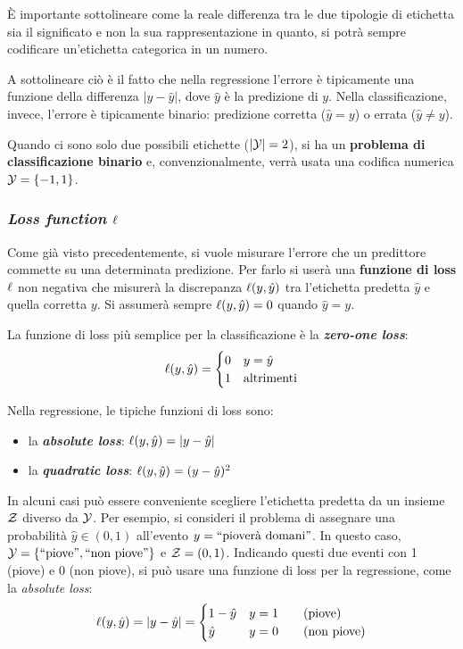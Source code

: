 È importante sottolineare come la reale differenza tra le due tipologie di etichetta sia il
significato e non la sua rappresentazione in quanto, si potrà sempre codificare
un'etichetta categorica in un numero.

A sottolineare ciò è il fatto che nella regressione l'errore è tipicamente una funzione della
differenza $| y-\hat{y} |$, dove $\hat{y}$ è la predizione di $y$. Nella classificazione, invece,
l'errore è tipicamente binario: predizione corretta ($\hat{y}=y$) o errata ($\hat{y}\neq y$).

Quando ci sono solo due possibili etichette ($|\mathcal{Y}|=2$), si ha un \textbf{problema di 
classificazione binario} e, convenzionalmente, verrà usata una codifica numerica 
$\mathcal{Y}=\{-1,1\}$.

\subsubsection{\textit{Loss function} \texorpdfstring{$\ell$}{l}}
Come già visto precedentemente, si vuole misurare l'errore che un predittore commette su una
determinata predizione. Per farlo si userà una \textbf{funzione di loss} $\ell$ non negativa 
che misurerà la discrepanza $\ell(y,\hat{y})$ tra l'etichetta predetta $\hat{y}$ e quella
corretta $y$. Si assumerà sempre $\ell(y,\hat{y})=0$ quando $\hat{y}=y$.

La funzione di loss più semplice per la classificazione è la \textit{\textbf{zero-one loss}}:
$$ \ell(y,\hat{y}) = \begin{cases} 0 & y=\hat{y} \\ 1 & \text{altrimenti} \end{cases} $$

Nella regressione, le tipiche funzioni di loss sono:
\begin{itemize}
    \item la \textit{\textbf{absolute loss}}: $\ell(y,\hat{y}) = |y-\hat{y}|$
    \item la \textit{\textbf{quadratic loss}}: $\ell(y,\hat{y}) = (y-\hat{y})^2$
\end{itemize}

In alcuni casi può essere conveniente scegliere l'etichetta predetta da un insieme $\mathcal{Z}$ diverso 
da $\mathcal{Y}$. Per esempio, si consideri il problema di assegnare una probabilità $\hat{y}\in (0,1)$
all'evento $y=\text{``pioverà domani''}$. In questo caso, $\mathcal{Y}=\{\text{``piove''},
\text{``non piove''}\}$ e $\mathcal{Z} = (0,1)$. Indicando questi due eventi con 1 (piove) e 0 
(non piove), si può usare una funzione di loss per la regressione, come la 
\textit{absolute loss}:
$$ \ell(y,\hat{y}) = |y-\hat{y}| =  \begin{cases} 1-\hat{y} & y=1 \qquad (\text{piove}) \\
\hat{y} & y=0 \qquad (\text{non piove}) \end{cases} $$

